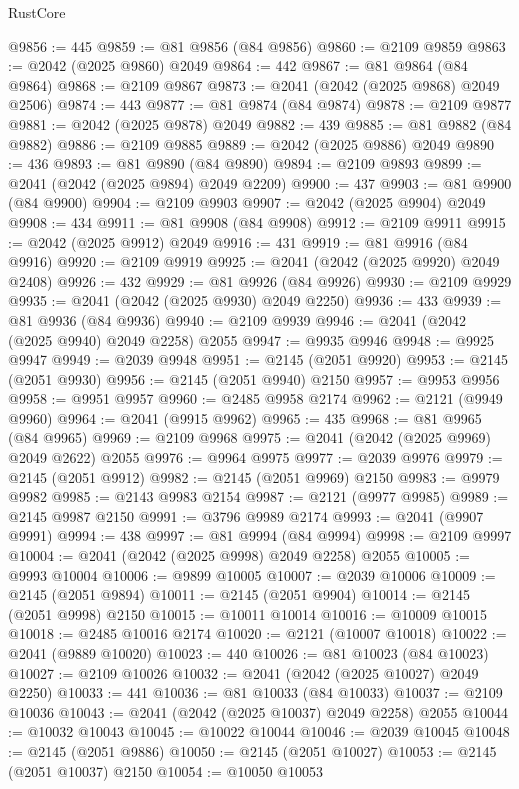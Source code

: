 \begin{lexlean}{RustCore}
\begin{coremodule}
@9856 := 445
@9859 := @81 @9856 (@84 @9856)
@9860 := @2109 @9859
@9863 := @2042 (@2025 @9860) @2049
@9864 := 442
@9867 := @81 @9864 (@84 @9864)
@9868 := @2109 @9867
@9873 := @2041 (@2042 (@2025 @9868) @2049 @2506)
@9874 := 443
@9877 := @81 @9874 (@84 @9874)
@9878 := @2109 @9877
@9881 := @2042 (@2025 @9878) @2049
@9882 := 439
@9885 := @81 @9882 (@84 @9882)
@9886 := @2109 @9885
@9889 := @2042 (@2025 @9886) @2049
@9890 := 436
@9893 := @81 @9890 (@84 @9890)
@9894 := @2109 @9893
@9899 := @2041 (@2042 (@2025 @9894) @2049 @2209)
@9900 := 437
@9903 := @81 @9900 (@84 @9900)
@9904 := @2109 @9903
@9907 := @2042 (@2025 @9904) @2049
@9908 := 434
@9911 := @81 @9908 (@84 @9908)
@9912 := @2109 @9911
@9915 := @2042 (@2025 @9912) @2049
@9916 := 431
@9919 := @81 @9916 (@84 @9916)
@9920 := @2109 @9919
@9925 := @2041 (@2042 (@2025 @9920) @2049 @2408)
@9926 := 432
@9929 := @81 @9926 (@84 @9926)
@9930 := @2109 @9929
@9935 := @2041 (@2042 (@2025 @9930) @2049 @2250)
@9936 := 433
@9939 := @81 @9936 (@84 @9936)
@9940 := @2109 @9939
@9946 := @2041 (@2042 (@2025 @9940) @2049 @2258) @2055
@9947 := @9935 @9946
@9948 := @9925 @9947
@9949 := @2039 @9948
@9951 := @2145 (@2051 @9920)
@9953 := @2145 (@2051 @9930)
@9956 := @2145 (@2051 @9940) @2150
@9957 := @9953 @9956
@9958 := @9951 @9957
@9960 := @2485 @9958 @2174
@9962 := @2121 (@9949 @9960)
@9964 := @2041 (@9915 @9962)
@9965 := 435
@9968 := @81 @9965 (@84 @9965)
@9969 := @2109 @9968
@9975 := @2041 (@2042 (@2025 @9969) @2049 @2622) @2055
@9976 := @9964 @9975
@9977 := @2039 @9976
@9979 := @2145 (@2051 @9912)
@9982 := @2145 (@2051 @9969) @2150
@9983 := @9979 @9982
@9985 := @2143 @9983 @2154
@9987 := @2121 (@9977 @9985)
@9989 := @2145 @9987 @2150
@9991 := @3796 @9989 @2174
@9993 := @2041 (@9907 @9991)
@9994 := 438
@9997 := @81 @9994 (@84 @9994)
@9998 := @2109 @9997
@10004 := @2041 (@2042 (@2025 @9998) @2049 @2258) @2055
@10005 := @9993 @10004
@10006 := @9899 @10005
@10007 := @2039 @10006
@10009 := @2145 (@2051 @9894)
@10011 := @2145 (@2051 @9904)
@10014 := @2145 (@2051 @9998) @2150
@10015 := @10011 @10014
@10016 := @10009 @10015
@10018 := @2485 @10016 @2174
@10020 := @2121 (@10007 @10018)
@10022 := @2041 (@9889 @10020)
@10023 := 440
@10026 := @81 @10023 (@84 @10023)
@10027 := @2109 @10026
@10032 := @2041 (@2042 (@2025 @10027) @2049 @2250)
@10033 := 441
@10036 := @81 @10033 (@84 @10033)
@10037 := @2109 @10036
@10043 := @2041 (@2042 (@2025 @10037) @2049 @2258) @2055
@10044 := @10032 @10043
@10045 := @10022 @10044
@10046 := @2039 @10045
@10048 := @2145 (@2051 @9886)
@10050 := @2145 (@2051 @10027)
@10053 := @2145 (@2051 @10037) @2150
@10054 := @10050 @10053

\end{coremodule}
\end{lexlean}
